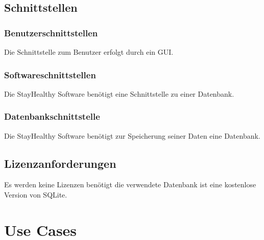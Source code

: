 \documentclass[12pt,a4paper,onecolumn]{article}
\begin{document}
\subsection{Schnittstellen}
\subsubsection{Benutzerschnittstellen}
Die Schnittstelle zum Benutzer erfolgt durch ein GUI.
\subsubsection{Softwareschnittstellen}
Die StayHealthy Software benötigt eine Schnittstelle zu einer Datenbank.
\subsubsection{Datenbankschnittstelle}
Die StayHealthy Software benötigt zur Speicherung seiner Daten eine Datenbank.
\subsection{Lizenzanforderungen}
Es werden keine Lizenzen benötigt die verwendete Datenbank ist eine kostenlose Version von SQLite.

\section{Use Cases}
\end{document}
